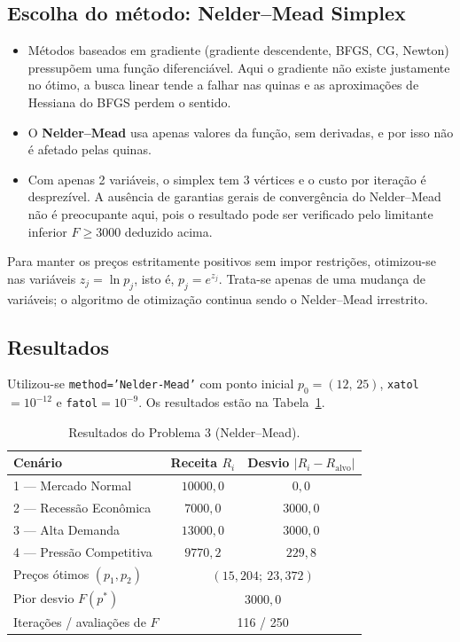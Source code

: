 \documentclass[12pt,a4paper]{article}
\begin{document}
\subsection{Escolha do método: Nelder--Mead Simplex}

\begin{itemize}
  \item Métodos baseados em gradiente (gradiente descendente, BFGS, CG, Newton) pressupõem uma função diferenciável. Aqui o gradiente não existe justamente no ótimo, a busca linear tende a falhar nas quinas e as aproximações de Hessiana do BFGS perdem o sentido.
  \item O \textbf{Nelder--Mead} usa apenas valores da função, sem derivadas, e por isso não é afetado pelas quinas.
  \item Com apenas 2 variáveis, o simplex tem 3 vértices e o custo por iteração é desprezível. A ausência de garantias gerais de convergência do Nelder--Mead não é preocupante aqui, pois o resultado pode ser verificado pelo limitante inferior $F\ge3000$ deduzido acima.
\end{itemize}

Para manter os preços estritamente positivos sem impor restrições, otimizou-se nas variáveis $z_j=\ln p_j$, isto é, $p_j=e^{z_j}$. Trata-se apenas de uma mudança de variáveis; o algoritmo de otimização continua sendo o Nelder--Mead irrestrito.

\subsection{Resultados}

Utilizou-se \texttt{method='Nelder-Mead'} com ponto inicial $p_0=(12,\,25)$, \texttt{xatol}$=10^{-12}$ e \texttt{fatol}$=10^{-9}$. Os resultados estão na Tabela~\ref{tab:q3}.

\begin{table}[H]
\centering
\caption{Resultados do Problema 3 (Nelder--Mead).}
\label{tab:q3}
\begin{tabular}{@{}lcc@{}}
\toprule
Cenário & Receita $R_i$ & Desvio $|R_i-R_{\mathrm{alvo}}|$ \\
\midrule
1 --- Mercado Normal      & $10000{,}0$ & $0{,}0$ \\
2 --- Recessão Econômica  & $7000{,}0$  & $3000{,}0$ \\
3 --- Alta Demanda        & $13000{,}0$ & $3000{,}0$ \\
4 --- Pressão Competitiva & $9770{,}2$  & $229{,}8$ \\
\midrule
Preços ótimos $(p_1,p_2)$ & \multicolumn{2}{c}{$(15{,}204;\ 23{,}372)$} \\
Pior desvio $F(p^*)$ & \multicolumn{2}{c}{$3000{,}0$} \\
Iterações / avaliações de $F$ & \multicolumn{2}{c}{116 / 250} \\
\bottomrule
\end{tabular}
\end{table}
\end{document}
